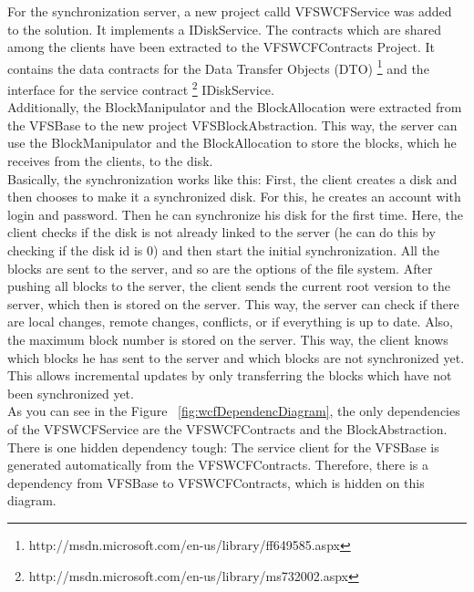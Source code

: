 \documentclass[JCDReport.tex]{subfiles}
\begin{document}

For the synchronization server, a new project calld VFSWCFService was added to the solution. It implements a IDiskService. The contracts which are shared among the clients have been extracted to the VFSWCFContracts Project. It contains the data contracts for the Data Transfer Objects (DTO) \footnote{http://msdn.microsoft.com/en-us/library/ff649585.aspx} and the interface for the service contract \footnote{http://msdn.microsoft.com/en-us/library/ms732002.aspx} IDiskService.\\

Additionally, the BlockManipulator and the BlockAllocation were extracted from the VFSBase to the new project VFSBlockAbstraction. This way, the server can use the BlockManipulator and the BlockAllocation to store the blocks, which he receives from the clients, to the disk.\\

Basically, the synchronization works like this: First, the client creates a disk and then chooses to make it a synchronized disk. For this, he creates an account with login and password. Then he can synchronize his disk for the first time. Here, the client checks if the disk is not already linked to the server (he can do this by checking if the disk id is 0) and then start the initial synchronization. All the blocks are sent to the server, and so are the options of the file system. After pushing all blocks to the server, the client sends the current root version to the server, which then is stored on the server. This way, the server can check if there are local changes, remote changes, conflicts, or if everything is up to date. Also, the maximum block number is stored on the server. This way, the client knows which blocks he has sent to the server and which blocks are not synchronized yet. This allows incremental updates by only transferring the blocks which have not been synchronized yet.\\

As you can see in the Figure ~\ref{fig:wcfDependencDiagram}, the only dependencies of the VFSWCFService are the VFSWCFContracts and the BlockAbstraction. There is one hidden dependency tough: The service client for the VFSBase is generated automatically from the VFSWCFContracts. Therefore, there is a dependency from VFSBase to VFSWCFContracts, which is hidden on this diagram.\\
\end{document}
